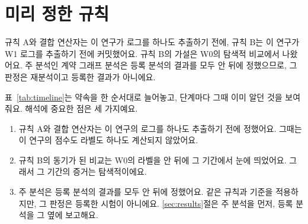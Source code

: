 \section{미리 정한 규칙}
\label{sec:protocol}

\begin{yoji}
규칙 A와 결합 연산자는 이 연구가 로그를 하나도 추출하기 전에, 규칙 B는 이 연구가 W1 로그를 추출하기 전에 커밋했어요. 규칙 B의 가설은 W0의 탐색적 비교에서 나왔어요. 주 분석인 계약 그래프 분석은 등록 분석의 결과를 모두 안 뒤에 정했으므로, 그 판정은 재분석이고 등록한 결과가 아니에요.
\end{yoji}

표~\ref{tab:timeline}는 약속을 한 순서대로 늘어놓고, 단계마다 그때 이미 알던 것을 보여 줘요. 해석에 중요한 점은 세 가지예요.
\begin{enumerate}
\item 규칙 A와 결합 연산자는 이 연구의 로그를 하나도 추출하기 전에 정했어요. 그때는 이 연구의 점수도 라벨도 하나도 계산되지 않았어요.
\item 규칙 B의 동기가 된 비교는 W0의 라벨을 안 뒤에 그 기간에서 눈에 띄었어요. 그래서 그 기간의 증거는 탐색적이에요.
\item 주 분석은 등록 분석의 결과를 모두 안 뒤에 정했어요. 같은 규칙과 기준을 적용하지만, 그 판정은 등록한 시험이 아니에요. \ref{sec:results}절은 주 분석을 먼저, 등록 분석을 그 옆에 보고해요.
\end{enumerate}

